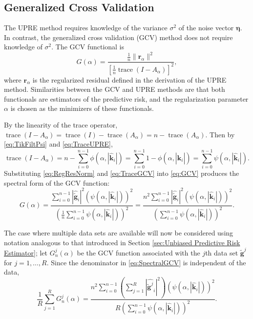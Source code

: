 \documentclass[12pt]{article}
\newcommand{\gnoise}{\widetilde{\mathbf{g}}}
\newcommand{\kdis}{\mathbf{k}}
\newcommand{\trace}{\operatorname{trace}}	%
\newcommand{\regparam}{\alpha}
\newcommand{\filt}{\phi}
\newcommand{\mfilt}{\psi}
\newcommand{\noiseSD}{\sigma}	%
\newcommand{\noise}{\bm{\eta}}	%
\newcommand{\regres}{\mathbf{r}_{\regparam}}	%
\newcommand{\A}{A_{\regparam}}	%
\newcommand{\GCV}{G}	%
\begin{document}
\subsection{Generalized Cross Validation} \label{sec:Generalized Cross Validation}
The UPRE method requires knowledge of the variance $\noiseSD^2$ of the noise vector $\noise$. In contrast, the generalized cross validation (GCV) method does not require knowledge of $\noiseSD^2$. The GCV functional is
\begin{equation}
\label{eq:GCV}
\GCV(\regparam) = \frac{\frac{1}{n}\|\regres\|^2}{\left[\frac{1}{n}\trace(I-\A)\right]^2},
\end{equation}
where $\regres$ is the regularized residual defined in the derivation of the UPRE method. Similarities between the GCV and UPRE methods are that both functionals are estimators of the predictive risk, and the regularization parameter $\regparam$ is chosen as the minimizers of these functionals. \par 
By the linearity of the trace operator, $\trace(I-\A) = \trace(I)-\trace(\A) = n - \trace(\A)$. Then by \eqref{eq:TikFiltPsi} and \eqref{eq:TraceUPRE},
\begin{equation}
\trace(I-\A) = n - \sum_{i = 0}^{n-1} \filt(\regparam,|\widehat{\kdis}_i|) = \sum_{i = 0}^{n-1} 1 - \filt(\regparam,|\widehat{\kdis}_i|) = \sum_{i = 0}^{n-1} \mfilt(\regparam,|\widehat{\kdis}_i|).
\label{eq:TraceGCV}
\end{equation}
Substituting \eqref{eq:RegResNorm} and \eqref{eq:TraceGCV} into \eqref{eq:GCV} produces the spectral form of the GCV function:
\begin{equation}
\GCV(\regparam) = \frac{\sum_{i = 0}^{n-1} |\widehat{\gnoise}_i|^2(\mfilt(\regparam,|\widehat{\kdis}_i|))^2}{(\frac{1}{n}\sum_{i = 0}^{n-1} \mfilt(\regparam,|\widehat{\kdis}_i|))^2} = \frac{n^2\sum_{i = 0}^{n-1} |\widehat{\gnoise}_i|^2(\mfilt(\regparam,|\widehat{\kdis}_i|))^2}{(\sum_{i = 0}^{n-1} \mfilt(\regparam,|\widehat{\kdis}_i|))^2}.
\label{eq:SpectralGCV}
\end{equation} \par 
The case where multiple data sets are available will now be considered using notation analogous to that introduced in Section \ref{sec:Unbiased Predictive Risk Estimator}; let $\GCV_n^j(\regparam)$ be the GCV function associated with the $j$th data set $\gnoise^j$ for $j = 1,\ldots,R$. Since the denominator in \eqref{eq:SpectralGCV} is independent of the data,
\begin{equation}
\frac{1}{R}\sum_{j=1}^R \GCV_n^j(\regparam)  = \frac{n^2\sum_{i = 0}^{n-1} \left(\sum_{j=1}^R |\widehat{\gnoise^j}_i|^2\right)(\mfilt(\regparam,|\widehat{\kdis}_i|))^2}{R(\sum_{i = 0}^{n-1} \mfilt(\regparam,|\widehat{\kdis}_i|))^2}.
\label{eq:SpectralGCVsum}
\end{equation}
\end{document}
